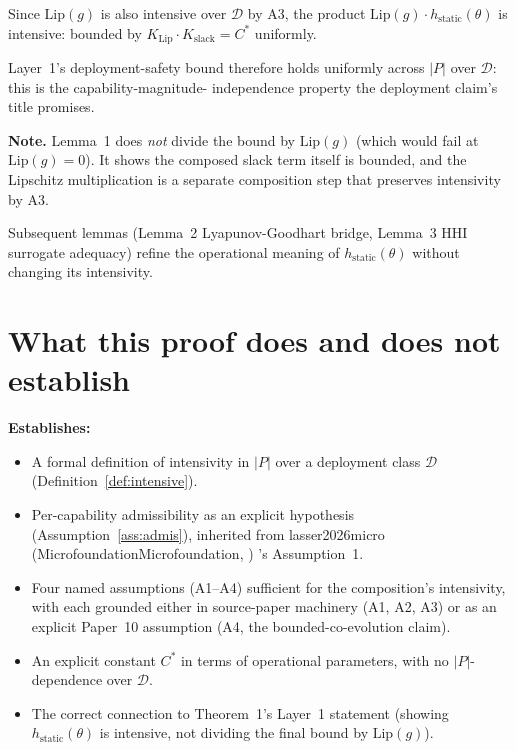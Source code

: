 \documentclass{article}
\makeatletter
\newcommand{\citep}[2][]{%
  \begingroup
  \def\@tmpkey{#2}%
  \ifx\@tmpkey\@empty\else
    (\ifx\@empty#1\@empty\else #1, \fi
     \@nameuse{bibkey@\@tmpkey})%
  \fi
  \endgroup
}
\makeatother
\begin{document}
Since $\mathrm{Lip}(g)$ is also intensive over $\mathcal{D}$ by A3,
the product $\mathrm{Lip}(g) \cdot h_{\mathrm{static}}(\theta)$ is
intensive: bounded by $K_{\mathrm{Lip}} \cdot K_{\mathrm{slack}} =
C^*$ uniformly.

Layer~1's deployment-safety bound therefore holds uniformly across
$|P|$ over $\mathcal{D}$: this is the capability-magnitude-
independence property the deployment claim's title promises.

\textbf{Note.} Lemma~1 does \emph{not} divide the bound by
$\mathrm{Lip}(g)$ (which would fail at $\mathrm{Lip}(g) = 0$). It
shows the composed slack term itself is bounded, and the Lipschitz
multiplication is a separate composition step that preserves
intensivity by A3.

Subsequent lemmas (Lemma~2 Lyapunov-Goodhart bridge, Lemma~3 HHI
surrogate adequacy) refine the operational meaning of
$h_{\mathrm{static}}(\theta)$ without changing its intensivity.

\section{What this proof does and does not establish}

\textbf{Establishes:}
\begin{itemize}
\item A formal definition of intensivity in $|P|$ over a deployment
  class $\mathcal{D}$ (Definition~\ref{def:intensive}).
\item Per-capability admissibility as an explicit hypothesis
  (Assumption~\ref{ass:admis}), inherited from
  \citep[Microfoundation]{lasser2026micro}'s Assumption~1.
\item Four named assumptions (A1--A4) sufficient for the
  composition's intensivity, with each grounded either in
  source-paper machinery (A1, A2, A3) or as an explicit Paper~10
  assumption (A4, the bounded-co-evolution claim).
\item An explicit constant $C^*$ in terms of operational parameters,
  with no $|P|$-dependence over $\mathcal{D}$.
\item The correct connection to Theorem~1's Layer~1 statement
  (showing $h_{\mathrm{static}}(\theta)$ is intensive, not dividing
  the final bound by $\mathrm{Lip}(g)$).
\end{itemize}
\end{document}
